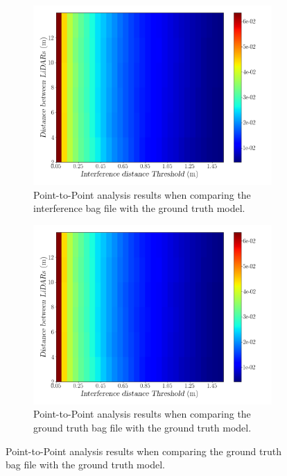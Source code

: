 \begin{figure}[!ht]
	\centering
	\begin{subfigure}[c]{0.45\textwidth}
		\includegraphics[width=\textwidth]{img/lidar-interference/LOS/interference_distance_color_mesh.png}
		\caption{Point-to-Point analysis results when comparing the interference bag file with the ground truth model.}
		\label{fig:los:interference-color-mesh}
	\end{subfigure}
	\qquad
	\begin{subfigure}[c]{0.45\textwidth}
		\includegraphics[width=\textwidth]{img/lidar-interference/LOS/ground_truth_distance_color_mesh.png}
		\caption{Point-to-Point analysis results when comparing the ground truth bag file with the ground truth model.}

\end{subfigure}
\end{figure}
